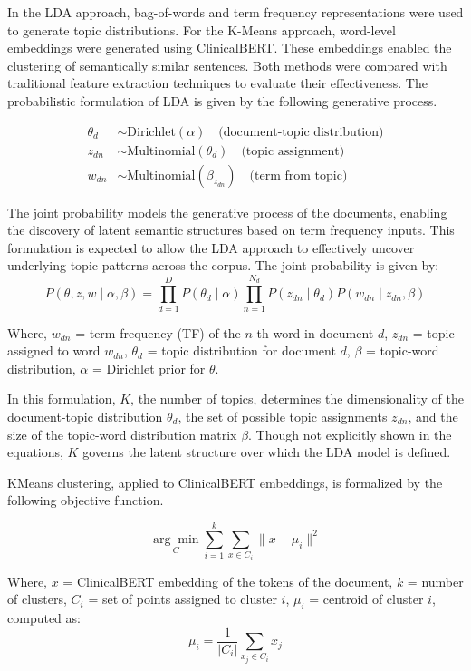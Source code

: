 In the LDA approach, bag-of-words and term frequency representations were used to generate topic distributions. For the K-Means approach, word-level embeddings were generated using ClinicalBERT. These embeddings enabled the clustering of semantically similar sentences. Both methods were compared with traditional feature extraction techniques to evaluate their effectiveness. The probabilistic formulation of LDA is given by the following generative process.

\begin{align*}
\theta_d &\sim \text{Dirichlet}(\alpha) \quad \text{(document-topic distribution)} \\
z_{dn} &\sim \text{Multinomial}(\theta_d) \quad \text{(topic assignment)} \\
w_{dn} &\sim \text{Multinomial}(\beta_{z_{dn}}) \quad \text{(term from topic)}
\end{align*}

The joint probability models the generative process of the documents, enabling the discovery of latent semantic structures based on term frequency inputs. This formulation is expected to allow the LDA approach to effectively uncover underlying topic patterns across the corpus. The joint probability is given by:
\[
P(\theta, z, w \mid \alpha, \beta) = \prod_{d=1}^{D} P(\theta_d \mid \alpha) \prod_{n=1}^{N_d} P(z_{dn} \mid \theta_d) P(w_{dn} \mid z_{dn}, \beta)
\]

Where,
$w_{dn}$ = term frequency (TF) of the $n$-th word in document $d$, 
$z_{dn}$ = topic assigned to word $w_{dn}$, 
$\theta_d$ = topic distribution for document $d$, 
$\beta$ = topic-word distribution, 
$\alpha$ = Dirichlet prior for $\theta$. \bigskip

In this formulation, $K$, the number of topics, determines the dimensionality of the document-topic distribution $\theta_d$, the set of possible topic assignments $z_{dn}$, and the size of the topic-word distribution matrix $\beta$. Though not explicitly shown in the equations, $K$ governs the latent structure over which the LDA model is defined.\bigskip

KMeans clustering, applied to ClinicalBERT embeddings, is formalized by the following objective function.

\[
\underset{C}{\arg\min} \sum_{i=1}^{k} \sum_{x \in C_i} \| x - \mu_i \|^2
\]

Where, 
$x$ = ClinicalBERT embedding of the tokens of the document, 
$k$ = number of clusters, 
$C_i$ = set of points assigned to cluster $i$, 
$\mu_i$ = centroid of cluster $i$, computed as:
\[
\mu_i = \frac{1}{|C_i|} \sum_{x_j \in C_i} x_j
\]


